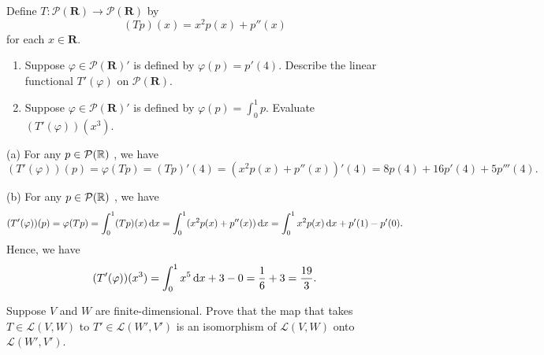 \documentclass{article}
\begin{document}
\begin{problem}[3F-15]
	Define $T : \mathcal{P}(\mathbf{R}) \to \mathcal{P}(\mathbf{R})$ by
	\[
		(Tp)(x) = x^2p(x) + p''(x)
	\]
	for each $x \in \mathbf{R}$.
	\begin{enumerate}[label=(\alph*)]
		\item Suppose $\varphi \in \mathcal{P}(\mathbf{R})'$ is defined by
		      $\varphi(p) = p'(4)$. Describe the linear functional
		      $T'(\varphi)$ on $\mathcal{P}(\mathbf{R})$.
		\item Suppose $\varphi \in \mathcal{P}(\mathbf{R})'$ is defined by
		      $\varphi(p) = \int_0^1 p$. Evaluate $(T'(\varphi))(x^3)$.
	\end{enumerate}
\end{problem}

\begin{solution}
	(a) For any \( p\in \mathcal{P}(\mathbb{R}) \) , we have
	\[ (T'(\varphi))(p)=\varphi(Tp)=(Tp)'(4)=(x^2p(x)+p''(x))'(4)=8p(4)+16p'(4)+5p'''(4). \] \par
	(b) For any \( p\in \mathcal{P}(\mathbb{R}) \) , we have
	\[ (T'(\varphi))(p)=\varphi(Tp)=\int_0^1 (Tp)(x)\,\mathrm{d} x=\int_0^1 (x^2p(x)+p''(x))\,\mathrm{d} x=\int_0^1 x^2p(x)\,\mathrm{d} x+p'(1)-p'(0). \] 
	Hence, we have
	\[ (T'(\varphi))(x^3)=\int_0^1 x^5\,\mathrm{d} x+3-0=\frac{1}{6}+3=\frac{19}{3}. \]
\end{solution}

\begin{problem}[3F-18]
	Suppose $V$ and $W$ are finite-dimensional. Prove that the map that takes
	$T \in \mathcal{L}(V, W)$ to $T' \in \mathcal{L}(W', V')$ is an isomorphism
	of $\mathcal{L}(V, W)$ onto $\mathcal{L}(W', V')$.
\end{problem}
\end{document}
